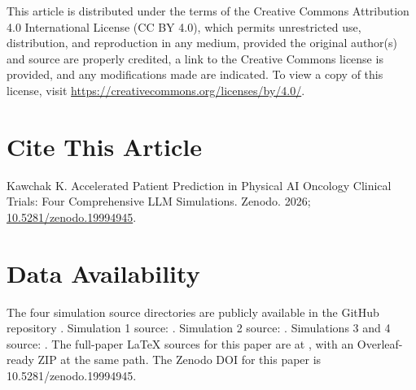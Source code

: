 This article is distributed under the terms of the Creative Commons
Attribution 4.0 International License (CC BY 4.0), which permits
unrestricted use, distribution, and reproduction in any medium,
provided the original author(s) and source are properly credited, a
link to the Creative Commons license is provided, and any
modifications made are indicated. To view a copy of this license,
visit \url{https://creativecommons.org/licenses/by/4.0/}.

{}
\section*{Cite This Article}
\label{sec:cite}

Kawchak K. Accelerated Patient Prediction in Physical AI Oncology
Clinical Trials: Four Comprehensive LLM Simulations. Zenodo. 2026;
\href{https://doi.org/10.5281/zenodo.19994945}{10.5281/zenodo.19994945}.

{}
\section*{Data Availability}
\label{sec:data}

The four simulation source directories are publicly available in the
 GitHub repository
\cite{main-repo}. Simulation 1 source: 
\cite{kawchak_2026_19176370, kawchak_2026_19244918}. Simulation 2
source:  \cite{kawchak_2026_19119939,
kawchak_2026_18810541}. Simulations 3 and 4 source:
 \cite{kawchak_2026_19396256}. The
full-paper LaTeX sources for this paper are at
, with an
Overleaf-ready ZIP at the same path. The Zenodo DOI for this paper is
10.5281/zenodo.19994945.
